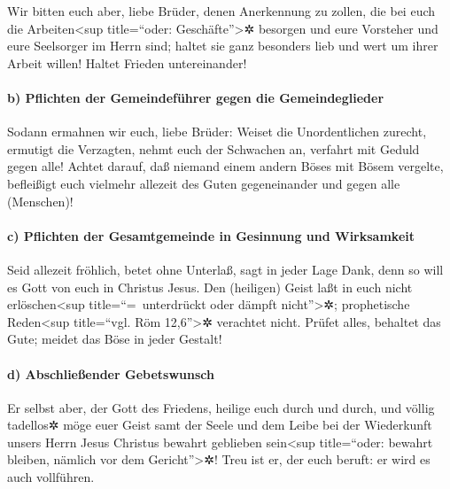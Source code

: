  Wir bitten euch aber, liebe Brüder, denen Anerkennung zu
zollen, die bei euch die Arbeiten\textless sup title=``oder:
Geschäfte''\textgreater✲ besorgen und eure Vorsteher und eure Seelsorger
im Herrn sind;  haltet sie ganz besonders lieb und wert
um ihrer Arbeit willen! Haltet Frieden untereinander!

\hypertarget{b-pflichten-der-gemeindefuxfchrer-gegen-die-gemeindeglieder}{%
\paragraph{b) Pflichten der Gemeindeführer gegen die
Gemeindeglieder}\label{b-pflichten-der-gemeindefuxfchrer-gegen-die-gemeindeglieder}}

 Sodann ermahnen wir euch, liebe Brüder: Weiset die
Unordentlichen zurecht, ermutigt die Verzagten, nehmt euch der Schwachen
an, verfahrt mit Geduld gegen alle!  Achtet darauf, daß
niemand einem andern Böses mit Bösem vergelte, befleißigt euch vielmehr
allezeit des Guten gegeneinander und gegen alle (Menschen)!

\hypertarget{c-pflichten-der-gesamtgemeinde-in-gesinnung-und-wirksamkeit}{%
\paragraph{c) Pflichten der Gesamtgemeinde in Gesinnung und
Wirksamkeit}\label{c-pflichten-der-gesamtgemeinde-in-gesinnung-und-wirksamkeit}}

 Seid allezeit fröhlich,  betet ohne
Unterlaß,  sagt in jeder Lage Dank, denn so will es Gott
von euch in Christus Jesus.  Den (heiligen) Geist laßt in
euch nicht erlöschen\textless sup title=``=~unterdrückt oder dämpft
nicht''\textgreater✲;  prophetische Reden\textless sup
title=``vgl. Röm 12,6''\textgreater✲ verachtet nicht. 
Prüfet alles, behaltet das Gute;  meidet das Böse in
jeder Gestalt!

\hypertarget{d-abschlieuxdfender-gebetswunsch}{%
\paragraph{d) Abschließender
Gebetswunsch}\label{d-abschlieuxdfender-gebetswunsch}}

 Er selbst aber, der Gott des Friedens, heilige euch
durch und durch, und völlig tadellos✲ möge euer Geist samt der Seele und
dem Leibe bei der Wiederkunft unsers Herrn Jesus Christus bewahrt
geblieben sein\textless sup title=``oder: bewahrt bleiben, nämlich vor
dem Gericht''\textgreater✲!  Treu ist er, der euch
beruft: er wird es auch vollführen.

